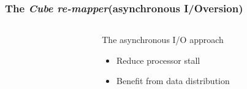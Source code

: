 \documentclass[slidestop,xcolor=dvipsnames, notes=hide]{beamer}
\newcommand{\toolTargetSoftware}			{\emph{Cube re-mapper}}
\newcommand{\notationIO}					{I/O}
\newcommand{\notationaio}					{asynchronous \notationIO}
\begin{document}
		\begin{frame}
			\frametitle{The \toolTargetSoftware\space (\notationaio\space version)}
			\begin{columns}[T]
				\begin{column}{.5\textwidth}
					\begin{minipage}[b]{0.6\textwidth}%
						\lst
					\end{minipage}
				\end{column}


				\begin{column}{.5\textwidth}
					\pause
					\begin{block}{The asynchronous I/O approach}
						\begin{itemize}
							\item Reduce processor stall
							\pause
							\item Benefit from data distribution
						\end{itemize}
					\end{block}
				\end{column}
			\end{columns}
		\end{frame}


\end{document}
